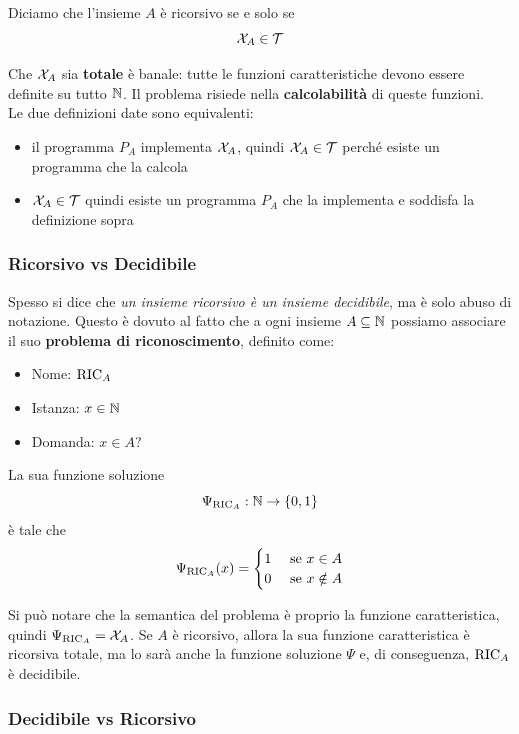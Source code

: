 Diciamo che l'insieme $A$ è ricorsivo se e solo se 
$$ \mathcal{X}_A \in \mathcal{T} $$

Che $\mathcal{X}_A$ sia \textbf{totale} è banale: tutte le funzioni caratteristiche devono essere definite su tutto $\mathbb{N}$. Il problema risiede nella \textbf{calcolabilità} di queste funzioni.\\

Le due definizioni date sono equivalenti:
\begin{itemize}
	\item il programma $P_A$ implementa $\mathcal{X}_A$, quindi $\mathcal{X}_A \in \mathcal{T}$ perché esiste un programma che la calcola
	\item $\mathcal{X}_A \in \mathcal{T}$ quindi esiste un programma $P_A$ che la implementa e soddisfa la definizione sopra
\end{itemize}

\subsubsection{Ricorsivo vs Decidibile}

Spesso si dice che \textit{un insieme ricorsivo è un insieme decidibile}, ma è solo abuso di notazione. Questo è dovuto al fatto che a ogni insieme $A \subseteq \mathbb{N}$ possiamo associare il suo \textbf{problema di riconoscimento}, definito come:
\begin{itemize}
	\item Nome: $\text{RIC}_A$ 
	\item Istanza: $x \in \mathbb{N}$
	\item Domanda: $x \in A$?
\end{itemize}

La sua funzione soluzione
$$ \Psi_{\text{RIC}_A} : \mathbb{N} \rightarrow \{0,1\} $$
è tale che
$$ 
\Psi_{\text{RIC}_A} (x) = \begin{cases}
	1 & \text{ se } x \in A\\
	0 & \text{ se } x \notin A
\end{cases}
$$

Si può notare che la semantica del problema è proprio la funzione caratteristica, quindi $\Psi_{\text{RIC}_A} = \mathcal{X}_A$. Se $A$ è ricorsivo, allora la sua funzione caratteristica è ricorsiva totale, ma lo sarà anche la funzione soluzione $\Psi$ e, di conseguenza, $\text{RIC}_A$ è decidibile.\\

\subsubsection{Decidibile vs Ricorsivo}

